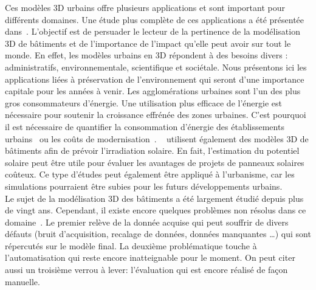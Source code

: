         Ces modèles 3D urbains offre plusieurs applications et sont important pour différents domaines.
        Une étude plus complète de ces applications a été présentée dans~\parencite{biljecki2015applications}.
        L'objectif est de persuader le lecteur de la pertinence de la modélisation 3D de bâtiments et de l'importance de l'impact qu'elle peut avoir sur tout le monde.
        En effet, les modèles urbains en 3D répondent à des besoins divers : administratifs, environnementale, scientifique et sociétale.
        Nous présentons ici les applications liées à préservation de l'environnement qui seront d'une importance capitale pour les années à venir.
        Les agglomérations urbaines sont l'un des plus gros consommateurs d'énergie.
        Une utilisation plus efficace de l'énergie est nécessaire pour soutenir la croissance effrénée des zones urbaines.
        C'est pourquoi il est nécessaire de quantifier la consommation d'énergie des établissements urbains~\parencite{wate20153d} ou les coûts de modernisation~\parencite{previtali2014automatic}.
        ~\textcite{biljecki2015propagation} utilisent également des modèles 3D de bâtiments afin de prévoir l'irradiation solaire.
        En fait, l'estimation du potentiel solaire peut être utile pour évaluer les avantages de projets de panneaux solaires coûteux.
        Ce type d'études peut également être appliqué à l'urbanisme, car les simulations pourraient être subies pour les futurs développements urbains.\\

        Le sujet de la modélisation 3D des bâtiments a été largement étudié depuis plus de vingt ans.
        Cependant, il existe encore quelques problèmes non résolus dans ce domaine~\parencite{musialski2013survey,lafarge2015some}.
        Le premier relève de la donnée acquise qui peut souffrir de divers défauts (bruit d'acquisition, recalage de données, données manquantes \dots) qui sont répercutés sur le modèle final.
        La deuxième problématique touche à l'automatisation qui reste encore inatteignable pour le moment.
        On peut citer aussi un troisième verrou à lever: l'évaluation qui est encore réalisé de façon manuelle.

